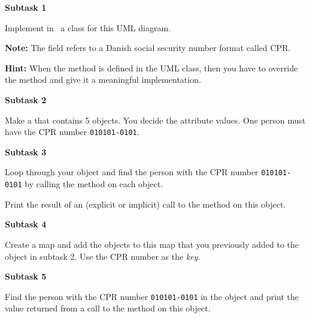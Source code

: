 \textbf{Subtask 1}

Implement in \csharp\ a class for this UML diagram.

\begin{center}
\end{center}

\textbf{Note:} The  field refers to a Danish social security number format called CPR.

\textbf{Hint:} When the  method is defined in the UML class, then you have to override the method and give it a meaningful implementation.

\textbf{Subtask 2}

Make a  that contains 5  objects. You decide the attribute values. One person must have the CPR number \texttt{010101-0101}.

\textbf{Subtask 3}

Loop through your  object and find the person with the CPR number \texttt{010101-0101} by calling the method  on each object.

Print the result of an (explicit or implicit) call to the  method on this object.

\textbf{Subtask 4}

Create a  map and add the  objects to this map that you previously added to the  object in subtask 2. Use the CPR number as the \textsl{key}.

\textbf{Subtask 5}

Find the person with the CPR number \texttt{010101-0101} in the  object and print the value returned from a call to the  method on this object.
